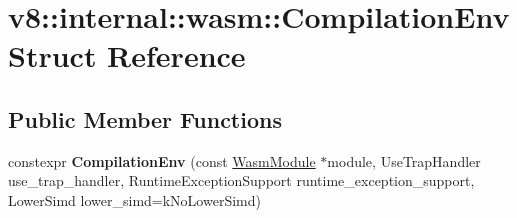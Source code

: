 \hypertarget{structv8_1_1internal_1_1wasm_1_1CompilationEnv}{}\section{v8\+:\+:internal\+:\+:wasm\+:\+:Compilation\+Env Struct Reference}
\label{structv8_1_1internal_1_1wasm_1_1CompilationEnv}
\subsection*{Public Member Functions}
\begin{DoxyCompactItemize}
\item 
\mbox{\label{structv8_1_1internal_1_1wasm_1_1CompilationEnv_a10569c1c8f07032b0f4b7dfcb5fde491}} 
constexpr {\bfseries Compilation\+Env} (const \mbox{\hyperlink{structv8_1_1internal_1_1wasm_1_1WasmModule}{Wasm\+Module}} $\ast$module, Use\+Trap\+Handler use\+\_\+trap\+\_\+handler, Runtime\+Exception\+Support runtime\+\_\+exception\+\_\+support, Lower\+Simd lower\+\_\+simd=k\+No\+Lower\+Simd)
\end{DoxyCompactItemize}
